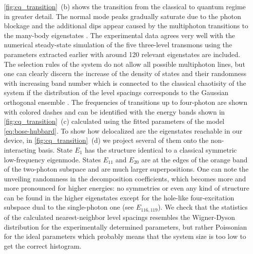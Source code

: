 \documentclass[%
 aps, pra,
 amsmath,amssymb,
 reprint,%
superscriptaddress
]{revtex4-2}
\begin{document}
\autoref{fig:cq_transition}~(b) shows the transition from the classical to quantum regime in greater detail. The normal mode peaks gradually saturate due to the photon blockage and the additional dips appear caused by the multiphoton transitions to the many-body eigenstates \cite{Biella2015,PhysRevA.102.013707,roberts2020driven}. The experimental data agrees very well with the numerical steady-state simulation of the five three-level transmons using the parameters extracted earlier with around 120 relevant eigenstates are included. The selection rules of the system do not allow all possible multiphoton lines, but one can clearly discern the increase of the density of states and their randomness with increasing band number which is connected to the classical chaotisity of the system if the distribution of the level spacings corresponds to the Gaussian orthogonal ensemble \cite{bohigas1984characterization,zimmermann1986manifestation, livan2018introduction}. The frequencies of transitions up to four-photon are shown with colored dashes and can be identified with the energy bands shown in \autoref{fig:cq_transition}~(c) calculated using the fitted parameters of the model \eqref{eq:bose-hubbard}. To show how delocalized are the eigenstates reachable in our device, in \autoref{fig:cq_transition}~(d) we project several of them onto the non-interacting basis. State $E_1$ has the structure identical to a classical symmetric low-frequency eigenmode. States $E_{11}$ and $E_{20}$ are at the edges of the orange band of the two-photon subspace and are much larger superpositions. One can note the unveiling randomness in the decomposition coefficients, which becomes more and more pronounced for higher energies: no symmetries or even any kind of structure can be found in the higher eigenstates except for the hole-like four-excitation subspace dual to the single-photon one (see $E_{116, 119}$). We check that the statistics of the calculated nearest-neighbor level spacings resembles the Wigner-Dyson distribution for the experimentally determined parameters, but rather Poissonian for the ideal parameters which probably means that the system size is too low to get the correct histogram.
\end{document}

